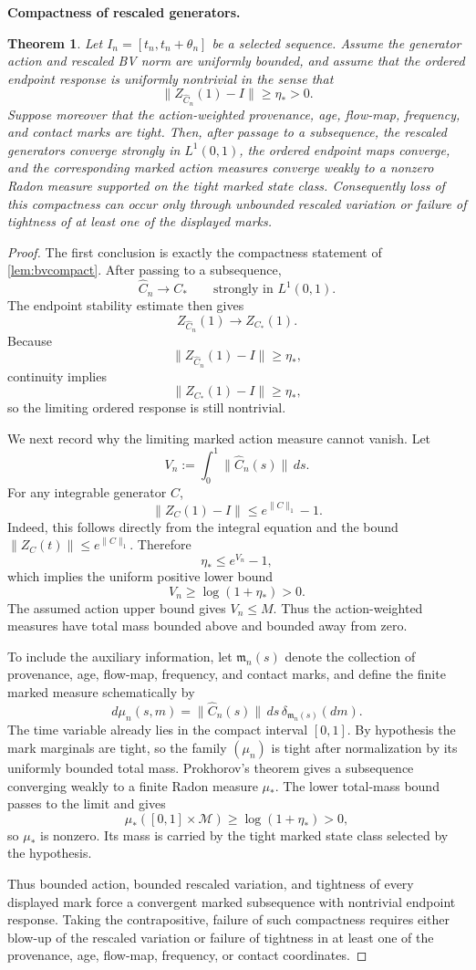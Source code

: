 \documentclass[11pt]{article}
\newtheorem{theorem}{Theorem}[section]
\theoremstyle{definition}\newtheorem{definition}[theorem]{Definition}
\theoremstyle{remark}\newtheorem{remark}[theorem]{Remark}
\begin{document}
\medskip
\noindent\textbf{Compactness of rescaled generators.}
\begin{theorem}\label{thm:bvrigidity}
Let $I_n=[t_n,t_n+\theta_n]$ be a selected sequence.  Assume the generator action and rescaled BV norm are uniformly bounded, and assume that the ordered endpoint response is uniformly nontrivial in the sense that
\[
 \|Z_{\widehat C_n}(1)-I\|\ge\eta_*>0.
\]
Suppose moreover that the action-weighted provenance, age, flow-map, frequency, and contact marks are tight.  Then, after passage to a subsequence, the rescaled generators converge strongly in $L^1(0,1)$, the ordered endpoint maps converge, and the corresponding marked action measures converge weakly to a nonzero Radon measure supported on the tight marked state class.  Consequently loss of this compactness can occur only through unbounded rescaled variation or failure of tightness of at least one of the displayed marks.
\end{theorem}
\begin{proof}
The first conclusion is exactly the compactness statement of \cref{lem:bvcompact}.  After passing to a subsequence,
\[
 \widehat C_n\to C_*
 \qquad\text{strongly in }L^1(0,1).
\]
The endpoint stability estimate then gives
\[
 Z_{\widehat C_n}(1)\to Z_{C_*}(1).
\]
Because
\[
 \|Z_{\widehat C_n}(1)-I\|\ge\eta_*,
\]
continuity implies
\[
 \|Z_{C_*}(1)-I\|\ge\eta_*,
\]
so the limiting ordered response is still nontrivial.

We next record why the limiting marked action measure cannot vanish.  Let
\[
 V_n:=\int_0^1\|\widehat C_n(s)\|\,ds.
\]
For any integrable generator $C$,
\[
 \|Z_C(1)-I\|
 \le e^{\|C\|_1}-1.
\]
Indeed, this follows directly from the integral equation and the bound $\|Z_C(t)\|\le e^{\|C\|_1}$.  Therefore
\[
 \eta_*
 \le e^{V_n}-1,
\]
which implies the uniform positive lower bound
\[
 V_n\ge \log(1+\eta_*)>0.
\]
The assumed action upper bound gives $V_n\le M$.  Thus the action-weighted measures have total mass bounded above and bounded away from zero.

To include the auxiliary information, let $\mathfrak m_n(s)$ denote the collection of provenance, age, flow-map, frequency, and contact marks, and define the finite marked measure schematically by
\[
 d\mu_n(s,m)
 =\|\widehat C_n(s)\|\,ds\,\delta_{\mathfrak m_n(s)}(dm).
\]
The time variable already lies in the compact interval $[0,1]$.  By hypothesis the mark marginals are tight, so the family $(\mu_n)$ is tight after normalization by its uniformly bounded total mass.  Prokhorov's theorem gives a subsequence converging weakly to a finite Radon measure $\mu_*$.  The lower total-mass bound passes to the limit and gives
\[
 \mu_*([0,1]\times\mathcal M)
 \ge\log(1+\eta_*)>0,
\]
so $\mu_*$ is nonzero.  Its mass is carried by the tight marked state class selected by the hypothesis.

Thus bounded action, bounded rescaled variation, and tightness of every displayed mark force a convergent marked subsequence with nontrivial endpoint response.  Taking the contrapositive, failure of such compactness requires either blow-up of the rescaled variation or failure of tightness in at least one of the provenance, age, flow-map, frequency, or contact coordinates.
\end{proof}
\end{document}
